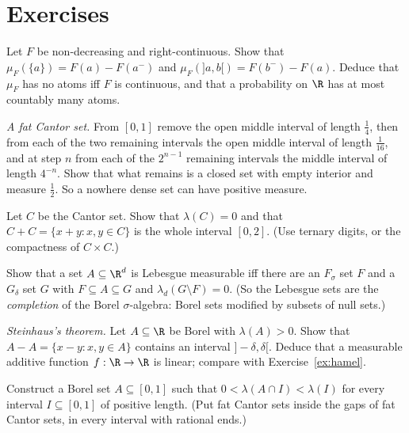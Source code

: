 \section{Exercises}

\begin{exercise}[$\star$]\label{ex:atoms}
Let $F$ be non-decreasing and right-continuous. Show that $\mu_F(\{a\})=F(a)-F(a^-)$ and $\mu_F(]a,b[)=F(b^-)-F(a)$. Deduce that $\mu_F$ has no atoms iff $F$ is continuous, and that a
probability on $\R$ has at most countably many atoms.
\end{exercise}

\begin{exercise}[$\star$]\label{ex:fatcantor}
\emph{A fat Cantor set.} From $[0,1]$ remove the open middle interval of length $\frac14$, then from each of the two remaining intervals the open middle interval of
length $\frac1{16}$, and at step $n$ from each of the $2^{n-1}$ remaining intervals the middle interval of length $4^{-n}$. Show that what remains is a closed set with empty
interior and measure $\frac12$. So a nowhere dense set can have positive measure.
\end{exercise}

\begin{exercise}[$\star\star$]\label{ex:cantorsum}
Let $C$ be the Cantor set. Show that $\lambda(C)=0$ and that $C+C=\{x+y:x,y\in C\}$ is the whole interval $[0,2]$. (Use ternary digits, or the compactness of $C\times C$.)
\end{exercise}

\begin{exercise}[$\star\star$]\label{ex:completion}
Show that a set $A\subseteq\R^d$ is Lebesgue measurable iff there are an $F_\sigma$ set $F$ and a $G_\delta$ set $G$ with $F\subseteq A\subseteq G$ and $\lambda_d(G\setminus F)=0$. (So the Lebesgue sets are the
\emph{completion} of the Borel $\sigma$-algebra: Borel sets modified by subsets of null sets.)
\end{exercise}

\begin{exercise}[$\star\star$]\label{ex:steinhaus}
\emph{Steinhaus's theorem.} Let $A\subseteq\R$ be Borel with $\lambda(A)>0$. Show that $A-A=\{x-y:x,y\in A\}$ contains an interval $]-\delta,\delta[$. Deduce that a measurable additive function
$f:\R\to\R$ is linear; compare with Exercise~\ref{ex:hamel}.
\end{exercise}

\begin{exercise}[$\star\star\star$]\label{ex:everywhere}
Construct a Borel set $A\subseteq[0,1]$ such that $0<\lambda(A\cap I)<\lambda(I)$ for every interval $I\subseteq[0,1]$ of positive length. (Put fat Cantor sets inside the gaps of fat Cantor sets, in
every interval with rational ends.)
\end{exercise}

